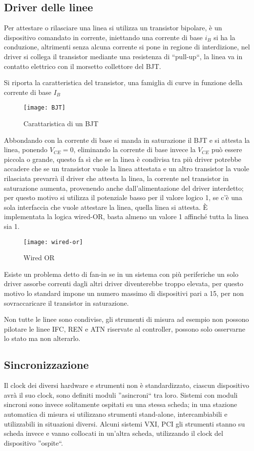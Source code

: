 \subsection{Driver delle linee}
Per attestare o rilasciare una linea si utilizza un transistor bipolare, è un
dispositivo comandato in corrente, iniettando una corrente di base $i_B$ si ha
la conduzione, altrimenti senza alcuna corrente si pone in regione di
interdizione, nel driver si collega il transistor mediante una resistenza di
``pull-up``, la linea va in contatto elettrico con il morsetto collettore del
BJT.

Si riporta la caratteristica del transistor, una famiglia di curve in funzione
della corrente di base $I_B$
\begin{figure}[h]
\centering
\texttt{[image: BJT]}
\caption{Carattaristica di un BJT}
\end{figure}

Abbondando con la corrente di base si manda in saturazione il BJT e si attesta
la linea, ponendo $V_{CE} = 0$, eliminando la corrente di base invece la
$V_{CE}$ può essere piccola o grande, questo fa sì che se la linea è condivisa
tra più driver potrebbe accadere che se un transistor vuole la linea attestata
e un altro transistor la vuole rilasciata prevarrà il driver che attesta la
linea, la corrente nel transistor in saturazione aumenta, provenendo anche
dall'alimentazione del driver interdetto; per questo motivo si utilizza il
potenziale basso per il valore logico 1, se c'è una sola interfaccia che vuole
attestare la linea, quella linea si attesta.
È implementata la logica wired-OR, basta almeno un valore 1 affinché tutta la
linea sia 1.

\begin{figure}[h]
\centering
\texttt{[image: wired-or]}
\caption{Wired OR}
\end{figure}

Esiste un problema detto di fan-in se in un sistema con più periferiche un solo
driver assorbe correnti dagli altri driver diventerebbe troppo elevata, per
questo motivo lo standard impone un numero massimo di dispositivi pari a 15,
per non sovraccaricare il transistor in saturazione.


Non tutte le linee sono condivise, gli strumenti di misura ad esempio non
possono pilotare le linee IFC, REN e ATN riservate al controller, possono solo
osservarne lo stato ma non alterarlo.

\subsection{Sincronizzazione}
Il clock dei diversi hardware e strumenti non è standardizzato, ciascun
dispositivo avrà il suo clock, sono definiti moduli ''asincroni`` tra loro.
Sistemi con moduli sincroni sono invece solitamente ospitati su una stessa
scheda; in una stazione automatica di misura si utilizzano strumenti
stand-alone, intercambiabili e utilizzabili in situazioni diversi.
Alcuni sistemi VXI, PCI gli strumenti stanno su scheda invece e vanno collocati
in un'altra scheda, utilizzando il clock del dispositivo ''ospite``.

